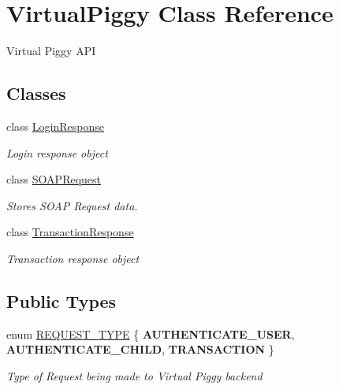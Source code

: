 \hypertarget{class_virtual_piggy}{\section{Virtual\-Piggy Class Reference}
\label{class_virtual_piggy}
}


Virtual Piggy A\-P\-I  


\subsection*{Classes}
\begin{DoxyCompactItemize}
\item 
class \hyperlink{class_virtual_piggy_1_1_login_response}{Login\-Response}
\begin{DoxyCompactList}\small\item\em Login response object \end{DoxyCompactList}\item 
class \hyperlink{class_virtual_piggy_1_1_s_o_a_p_request}{S\-O\-A\-P\-Request}
\begin{DoxyCompactList}\small\item\em Stores S\-O\-A\-P Request data. \end{DoxyCompactList}\item 
class \hyperlink{class_virtual_piggy_1_1_transaction_response}{Transaction\-Response}
\begin{DoxyCompactList}\small\item\em Transaction response object \end{DoxyCompactList}\end{DoxyCompactItemize}
\subsection*{Public Types}
\begin{DoxyCompactItemize}
\item 
enum \hyperlink{class_virtual_piggy_adca55d9dcf3fd7482dacac0ec3258afd}{R\-E\-Q\-U\-E\-S\-T\-\_\-\-T\-Y\-P\-E} \{ {\bfseries A\-U\-T\-H\-E\-N\-T\-I\-C\-A\-T\-E\-\_\-\-U\-S\-E\-R}, 
{\bfseries A\-U\-T\-H\-E\-N\-T\-I\-C\-A\-T\-E\-\_\-\-C\-H\-I\-L\-D}, 
{\bfseries T\-R\-A\-N\-S\-A\-C\-T\-I\-O\-N}
 \}
\begin{DoxyCompactList}\small\item\em Type of Request being made to Virtual Piggy backend \end{DoxyCompactList}\end{DoxyCompactItemize}
